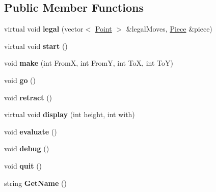 \subsection*{Public Member Functions}
\begin{DoxyCompactItemize}
\item 
\hypertarget{class_game_acf61b27aed22684d96fbc7fa2692feeb}{virtual void {\bfseries legal} (vector$<$ \hyperlink{struct_point}{Point} $>$ \&legal\-Moves, \hyperlink{class_piece}{Piece} \&piece)}\label{class_game_acf61b27aed22684d96fbc7fa2692feeb}

\item 
\hypertarget{class_game_a3d9b98f7c4a96ecf578f75b96c9f0e90}{virtual void {\bfseries start} ()}\label{class_game_a3d9b98f7c4a96ecf578f75b96c9f0e90}

\item 
\hypertarget{class_game_a50b3e0e1e7a73793a9f9eae1b0660eff}{void {\bfseries make} (int From\-X, int From\-Y, int To\-X, int To\-Y)}\label{class_game_a50b3e0e1e7a73793a9f9eae1b0660eff}

\item 
\hypertarget{class_game_ab411d0da584724addd4fdb96fc16b9a4}{void {\bfseries go} ()}\label{class_game_ab411d0da584724addd4fdb96fc16b9a4}

\item 
\hypertarget{class_game_a9be0655102af94f1a37a7eaec1be36fc}{void {\bfseries retract} ()}\label{class_game_a9be0655102af94f1a37a7eaec1be36fc}

\item 
\hypertarget{class_game_ac0c93cb242e1802b94072c3c94e7523a}{virtual void {\bfseries display} (int height, int with)}\label{class_game_ac0c93cb242e1802b94072c3c94e7523a}

\item 
\hypertarget{class_game_a3bc8822cacd9cf8c5f71021072eb24a4}{void {\bfseries evaluate} ()}\label{class_game_a3bc8822cacd9cf8c5f71021072eb24a4}

\item 
\hypertarget{class_game_a29997a321e10a5456f0aef9e95c51757}{void {\bfseries debug} ()}\label{class_game_a29997a321e10a5456f0aef9e95c51757}

\item 
\hypertarget{class_game_a8272be134d16c277bb014ad6a22fc357}{void {\bfseries quit} ()}\label{class_game_a8272be134d16c277bb014ad6a22fc357}

\item 
\hypertarget{class_game_ab81299d944d2779d482067640e576389}{string {\bfseries Get\-Name} ()}\label{class_game_ab81299d944d2779d482067640e576389}


\end{DoxyCompactItemize}
